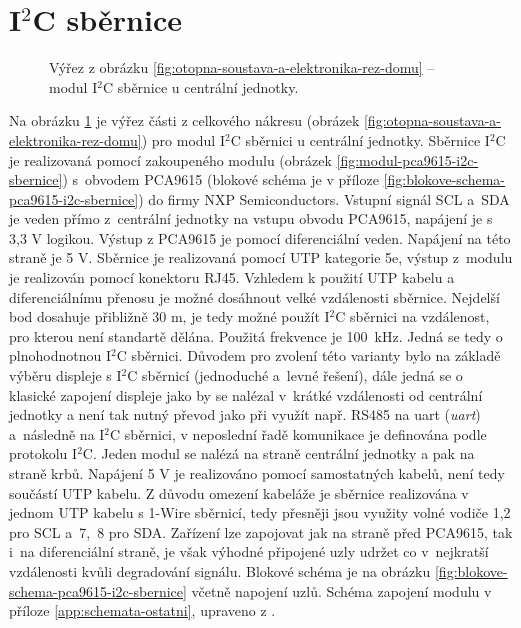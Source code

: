 \section{I$^2$C sběrnice}
\label{sec:i2c-sbernice}

\begin{figure}[H]
   \centering
    \def\svgwidth{0.3\columnwidth}
   
    \caption[Výřez pro modul I$^2$C sběrnice u centrální jednotky.]{Výřez z obrázku \ref{fig:otopna-soustava-a-elektronika-rez-domu} – modul I$^2$C sběrnice u centrální jednotky.}
    \label{fig:vyrez-i2c-sbernice}
\end{figure}

Na obrázku \ref{fig:vyrez-i2c-sbernice} je výřez části z celkového nákresu (obrázek \ref{fig:otopna-soustava-a-elektronika-rez-domu}) pro modul I$^2$C sběrnici u centrální jednotky. Sběrnice I$^2$C je realizovaná pomocí zakoupeného modulu (obrázek \ref{fig:modul-pca9615-i2c-sbernice}) s~obvodem PCA9615 \cite{vyrobce-pca9615} (blokové schéma je v příloze \ref{fig:blokove-schema-pca9615-i2c-sbernice}) do firmy  NXP Semiconductors. Vstupní signál SCL a~SDA je veden přímo z~centrální jednotky na vstupu obvodu PCA9615, napájení je s 3,3 V logikou. Výstup z PCA9615 je pomocí diferenciální veden. Napájení na této straně je 5 V. Sběrnice je realizovaná pomocí UTP kategorie 5e, výstup z~modulu je realizován pomocí konektoru RJ45. Vzhledem k použití UTP kabelu a diferenciálnímu přenosu je možné dosáhnout velké vzdálenosti sběrnice. Nejdelší bod dosahuje přibližně 30 m, je tedy možné použít I$^2$C sběrnici na vzdálenost, pro kterou není standartě dělána. Použitá frekvence je 100~kHz. Jedná se tedy o plnohodnotnou I$^2$C sběrnici. Důvodem pro zvolení této varianty bylo na základě výběru displeje s I$^2$C sběrnicí (jednoduché a~levné řešení), dále jedná se o klasické zapojení displeje jako by se nalézal v~krátké vzdálenosti od centrální jednotky a není tak nutný převod jako při využít např. RS485 na \acrshort{uart} (\textit{\acrlong{uart}}) a~následně na I$^2$C sběrnici, v neposlední řadě komunikace je definována podle protokolu I$^2$C.  Jeden modul se nalézá na straně centrální jednotky a pak na straně krbů. Napájení 5 V je realizováno pomocí samostatných kabelů, není tedy součástí UTP kabelu. Z důvodu omezení kabeláže je sběrnice realizována v jednom UTP kabelu s 1-Wire sběrnicí, tedy přesněji jsou využity volné vodiče 1,2 pro SCL a~7,~8 pro SDA. Zařízení lze zapojovat jak na straně před PCA9615, tak i~na diferenciální straně, je však výhodné připojené uzly udržet co v~nejkratší vzdálenosti kvůli degradování signálu. Blokové schéma je na obrázku \ref{fig:blokove-schema-pca9615-i2c-sbernice} včetně napojení uzlů. Schéma zapojení modulu v příloze \ref{app:schemata-ostatni}, upraveno z \cite{pca9615-schema-zapojeni}.


